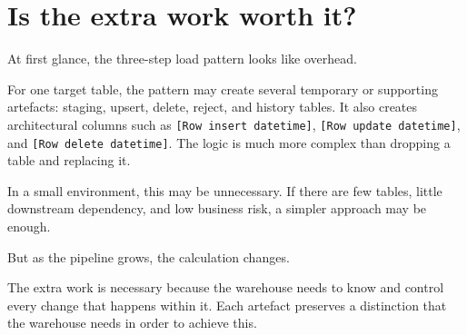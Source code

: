 \documentclass[10pt,openany,10pt]{book}
\begin{document}
\section{Is the extra work worth it?}\label{is-the-extra-work-worth-it}

At first glance, the three-step load pattern looks like overhead.

For one target table, the pattern may create several temporary or
supporting artefacts: staging, upsert, delete, reject, and history
tables. It also creates architectural columns such as
\texttt{{[}Row\ insert\ datetime{]}},
\texttt{{[}Row\ update\ datetime{]}}, and
\texttt{{[}Row\ delete\ datetime{]}}. The logic is much more complex
than dropping a table and replacing it.

In a small environment, this may be unnecessary. If there are few
tables, little downstream dependency, and low business risk, a simpler
approach may be enough.

But as the pipeline grows, the calculation changes.

The extra work is necessary because the warehouse needs to know and
control every change that happens within it. Each artefact preserves a
distinction that the warehouse needs in order to achieve this.
\end{document}
